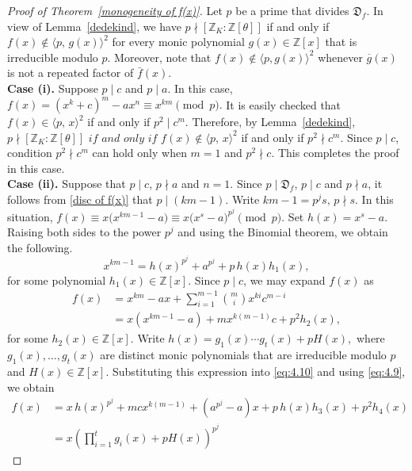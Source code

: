 \documentclass[10pt,a4paper]{amsart}
\newcommand{\D}{\mathfrak{D}}
\begin{document}
\begin{proof}[Proof of Theorem~\ref{monogeneity of f(x)}]
Let $p$ be a prime that divides $\D_f$. In view of Lemma~\ref{dedekind}, we have $p \nmid [\mathbb{Z}_K : \mathbb{Z}[\theta]]$
if and only if $f(x) \not\in \langle p,\, g(x) \rangle^2$
for every monic polynomial $g(x) \in \mathbb{Z}[x]$ that is irreducible modulo $p$. Moreover, note that
$f(x) \not\in \langle p, g(x) \rangle^2$
whenever $\overline{g}(x)$ is not a repeated factor of $\bar{f}(x)$.\\[2mm]
\textbf{Case (i).} Suppose $p \mid c$ and $p \mid a$. In this case, $f(x) = (x^k + c)^m - a x^n \equiv x^{km} \pmod{p}.$ It is easily checked that $f(x) \in \langle p,\, x \rangle^2 $ if and only if $p^2 \mid c^m.$
Therefore, by Lemma~\ref{dedekind}, $p \nmid [\mathbb{Z}_K : \mathbb{Z}[\theta]]
\textit{ if and only if }
f(x) \notin \langle p,\, x \rangle^2 $ if and only if $p^2 \nmid c^m.$ Since $p \mid c$, condition $p^2 \nmid c^m$ can hold only when $m=1$ and $p^2 \nmid c$. This completes the proof in this case.\\[2mm]
\textbf{Case (ii).} Suppose that $p\mid c$, $p\nmid a$ and $n=1$.
Since $p\mid \D_f$, $p\mid c$ and $p\nmid a$, it follows from
\eqref{disc of f(x)} that $p\mid (km-1).$ Write $km-1=p^{j}s,
\, p\nmid s.$ In this situation, $f(x)\equiv x\bigl(x^{km-1}-a\bigr)
      \equiv x\bigl(x^{s}-a\bigr)^{p^{j}}
      \pmod{p}.$
Set $h(x)=x^{s}-a.$ Raising both sides to the power $p^{j}$ and using the Binomial theorem, we obtain the following.
\begin{equation}\label{eq:4.9}
x^{km-1}
= h(x)^{p^{j}} + a^{p^{j}} + p\,h(x)h_{1}(x),
\end{equation}
for some polynomial $h_{1}(x)\in\mathbb{Z}[x]$. Since $p\mid c$, we may expand $f(x)$ as
\begin{align}\label{eq:4.10}
f(x)
&= x^{km}-ax+\sum_{i=1}^{m-1}\binom{m}{i}x^{ki}c^{m-i} \nonumber \\
&= x(x^{km-1}-a)+m x^{k(m-1)}c + p^{2}h_{2}(x),
\end{align}
for some $h_{2}(x)\in\mathbb{Z}[x]$. Write $h(x)=g_{1}(x)\cdots g_{t}(x)+pH(x),$ where $g_{1}(x),\ldots,g_{t}(x)$ are distinct monic polynomials that are irreducible modulo $p$ and $H(x)\in\mathbb{Z}[x]$.
Substituting this expression into \eqref{eq:4.10} and using
\eqref{eq:4.9}, we obtain
\begin{align*}
f(x)
&= x\,h(x)^{p^{j}} + m c x^{k(m-1)} + (a^{p^{j}}-a)x
   + p\,h(x)h_{3}(x) + p^{2}h_{4}(x) \\
&= x\left(\prod_{i=1}^{t} g_i(x)+pH(x)\right)^{p^{j}}

\end{align*}
\end{proof}
\end{document}
